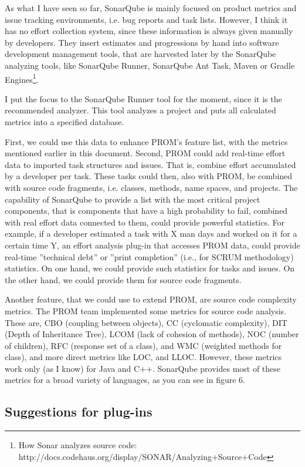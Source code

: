 As what I have seen so far, SonarQube is mainly focused on product metrics and
issue tracking environments, i.e. bug reports and task lists. However, I think
it has no effort collection system, since these information is always given
manually by developers. They insert estimates and progressions by hand into
software development management tools, that are harvested later by the SonarQube
analyzing tools, like SonarQube Runner, SonarQube Ant Task, Maven or Gradle
Engines\footnote{How Sonar analyzes source code: http://docs.codehaus.org/display/SONAR/Analyzing+Source+Code}.

I put the focus to the SonarQube Runner tool for the moment, since it is the
recommended analyzer.  This tool analyzes a project and puts all calculated
metrics into a specified database. 

First, we could use this data to enhance PROM's feature list, with the metrics
mentioned earlier in this document.
Second, PROM could add real-time effort data to imported task structures and
issues. That is, combine effort accumulated by a developer per task. These tasks
could then, also with PROM, be combined with source code fragments, i.e.
classes, methods, name spaces, and projects. The capability of SonarQube to
provide a list with the most critical project components, that is components
that have a high probability to fail, combined with real effort data connected
to them, could provide powerful statistics. For example, if a developer
estimated a task with X man days and worked on it for a certain time Y, an
effort analysis plug-in that accesses PROM data, could provide real-time
''technical debt'' or ''print completion'' (i.e., for SCRUM methodology)
statistics. On one hand, we could provide such statistics for tasks and issues.
On the other hand, we could provide them for source code fragments.

Another feature, that we could use to extend PROM, are source code complexity
metrics. The PROM team implemented some metrics for source code analysis. These
are, CBO (coupling between objects),  CC (cyclomatic complexity), DIT (Depth of
Inheritance Tree), LCOM (lack of cohesion of methods), NOC (number of children),
RFC (response set of a class), and WMC (weighted methods for class), and more
direct metrics like LOC, and LLOC. However, these metrics work only (as I know)
for Java and C++. SonarQube provides most of these metrics for a broad variety
of languages, as you can see in figure 6.

\subsection{Suggestions for plug-ins}

